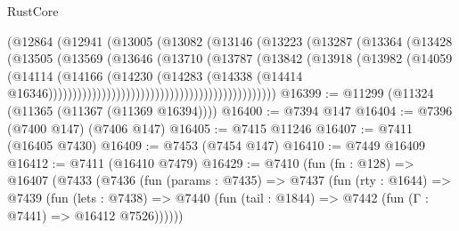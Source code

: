 \begin{lexlean}{RustCore}
\begin{coremodule}
                                                  (@12864
                                                    (@12941
                                                      (@13005
                                                        (@13082
                                                          (@13146
                                                            (@13223
                                                              (@13287
                                                                (@13364
                                                                  (@13428
                                                                    (@13505
                                                                      (@13569
                                                                        (@13646
                                                                          (@13710
                                                                            (@13787
                                                                              (@13842
                                                                                (@13918
                                                                                  (@13982
                                                                                    (@14059
                                                                                      (@14114
                                                                                        (@14166
                                                                                          (@14230
                                                                                            (@14283
                                                                                              (@14338
                                                                                                (@14414
                                                                                                  @16346)))))))))))))))))))))))))))))))))))))))))))))))
@16399 := @11299 (@11324 (@11365 (@11367 (@11369 @16394))))
@16400 := @7394 @147
@16404 := @7396 (@7400 @147) (@7406 @147)
@16405 := @7415 @11246
@16407 := @7411 (@16405 @7430)
@16409 := @7453 (@7454 @147)
@16410 := @7449 @16409
@16412 := @7411 (@16410 @7479)
@16429 := @7410
    (fun (fn : @128) =>
    @16407
      (@7433
        (@7436
          (fun (params : @7435) =>
          @7437
            (fun (rty : @1644) =>
            @7439
              (fun (lets : @7438) =>
              @7440 (fun (tail : @1844) => @7442 (fun (Γ : @7441) => @16412 @7526))))))

\end{coremodule}
\end{lexlean}

